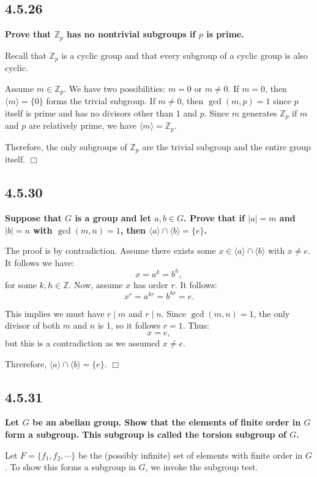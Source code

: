 \documentclass[11pt, a4paper]{article}
\begin{document}
\subsection{4.5.26}
\textbf{Prove that $\mathbb{Z}_{p}$ has no nontrivial subgroups if $p$ is prime.}

Recall that $\mathbb{Z}_{p}$ is a cyclic group and that every subgroup of a cyclic group is also cyclic. 

Assume $m \in \mathbb{Z}_{p}$. We have two possibilities: $m = 0$ or $m \neq 0$. If $m = 0$, then $\langle m \rangle = \{0\}$ forms the trivial subgroup. If $m \neq 0$, then $\gcd(m, p) = 1$ since $p$ itself is prime and has no divisors other than $1$ and $p$. Since $m$ generates $\mathbb{Z}_{p}$ if $m$ and $p$ are relatively prime, we have $\langle m \rangle = \mathbb{Z}_{p}$.

Therefore, the only subgroups of $\mathbb{Z}_{p}$ are the trivial subgroup and the entire group itself. $\Box$

\newpage

\subsection{4.5.30}
\textbf{Suppose that $G$ is a group and let $a, b \in G$. Prove that if $|a| = m$ and $|b| = n$ with $\gcd(m, n) = 1$, then $\langle a \rangle \cap \langle b \rangle = \{e\}$.}

The proof is by contradiction. Assume there exists some $x \in \langle a \rangle \cap \langle b \rangle$ with $x \neq e$. It follows we have:
\[
  x = a^{k} = b^{h},
\]
for some $k, h \in \mathbb{Z}$. Now, assume $x$ has order $r$. It follows:
\[
  x^r = a^{kr} = b^{hr} = e.
\]

This implies we must have $r \mid m$ and $r \mid n$. Since $\gcd(m, n) = 1$, the only divisor of both $m$ and $n$ is 1, so it follows $r = 1$. Thus:
\[
  x = e,
\]
but this is a contradiction as we assumed $x \neq e$.

Threrefore, $\langle a \rangle \cap \langle b \rangle = \{e\}$. $\Box$

\subsection{4.5.31}
\textbf{Let $G$ be an abelian group. Show that the elements of finite order in $G$ form a subgroup. This subgroup is called the torsion subgroup of $G$.}

Let $F = \{f_{1}, f_{2}, \cdots\}$ be the (possibly infinite) set of elements with finite order in $G$. To show this forms a subgroup in $G$, we invoke the subgroup test.
\end{document}
